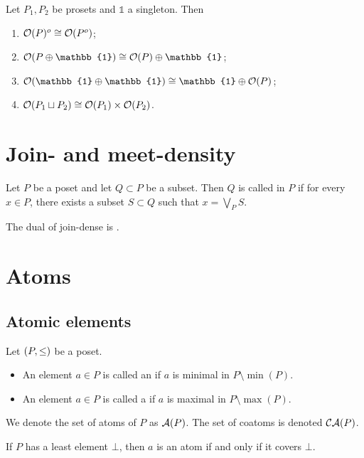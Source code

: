 \begin{lemma}
Let $P_1,P_2$ be prosets and $\mathbb{1}$ a singleton. Then
\begin{enumerate}
\item $\operatorname{\mathcal{O}}(P)^o \cong \operatorname{\mathcal{O}}(P^o)$;
\item $\downsets(P\oplus \mathbb{1}) \cong \downsets(P)\oplus \mathbb{1}$;
\item $\downsets(\mathbb{1}\oplus \mathbb{1}) \cong \mathbb{1}\oplus \downsets(P)$;
\item $\operatorname{\mathcal{O}}(P_1\sqcup P_2)\cong \operatorname{\mathcal{O}}(P_1)\times \operatorname{\mathcal{O}}(P_2)$.
\end{enumerate}
\end{lemma}

\section{Join- and meet-density}
\begin{definition}
Let $P$ be a poset and let $Q\subset P$ be a subset. Then $Q$ is called  in $P$ if for every $x\in P$, there exists a subset $S\subset Q$ such that $x= \bigvee_P S$.

The dual of join-dense is .
\end{definition}

\section{Atoms}
\subsection{Atomic elements}
\begin{definition}
Let $\left( P,\leq \right)$ be a poset.
\begin{itemize}
\item An element $a\in P$ is called an  if $a$ is minimal in $P\setminus\min(P)$.
\item An element $a\in P$ is called a  if $a$ is maximal in $P\setminus\max(P)$.
\end{itemize}
We denote the set of atoms of $P$ as $\operatorname{\mathcal{A}}(P)$. The set of coatoms is denoted $\operatorname{\mathcal{CA}}(P)$.
\end{definition}
If $P$ has a least element $\bot$, then $a$ is an atom if and only if it covers $\bot$.



